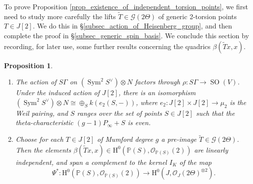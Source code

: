 \documentclass{article} %
\newtheorem{proposition}{Proposition}[section]
\numberwithin{equation}{section}
\DeclareMathOperator{\SO}{SO}
\DeclareMathOperator{\Sym}{Sym}
\renewcommand{\P}{\mathbb{P}}
\renewcommand{\O}{\mathcal{O}}
\newcommand{\HH}{\mathrm{H}}
\newcommand{\cO}{\mathcal{O}}
\begin{document}
To prove Proposition \ref{prop_existence_of_independent_torsion_points}, we first need to study more carefully the lifts $\widetilde{T} \in \mathcal{G}(2 \Theta)$ of generic 2-torsion points $T \in J[2]$. We do this in \S \ref{subsec_action_of_Heisenberg_group}, and then complete the proof in \S \ref{subsec_generic_spin_basis}. We conclude this section by recording, for later use, some further results concerning the quadrics $\beta( \widetilde{T} x,x)$.
\begin{proposition}\label{prop_q_tildes_inject_to_Kummer}
    \begin{enumerate}
        \item The action of $S \Gamma$ on $(\Sym^2 S^\vee) \otimes N$ factors through $\rho : S \Gamma \to \SO(V)$. Under the induced action of $J[2]$, there is an isomorphism $(\Sym^2 S^\vee) \otimes N \cong \oplus_S k(e_2(S, -))$, where $e_2 : J[2] \times J[2] \to \mu_2$ is the Weil pairing, and $S$ ranges over the set of points $S \in J[2]$ such that the theta-characteristic $(g-1) P_\infty + S$ is even. 
        \item Choose for each $T \in J[2]$ of Mumford degree $g$ a pre-image $\widetilde{T} \in \mathcal{G}(2 \Theta)$. Then the elements $\beta(\widetilde{T} x,x) \in\HH^0(\P(S), \cO_{\P(S)}(2))$ are linearly independent, and span a complement to the kernel $I_K$ of the map
        \[ \Psi^\ast :\HH^0(\P(S), \cO_{\P(S)}(2)) \to\HH^0(J, \O_J(2 \Theta)^{\otimes 2}). \]
    \end{enumerate}
\end{proposition}
\end{document}
